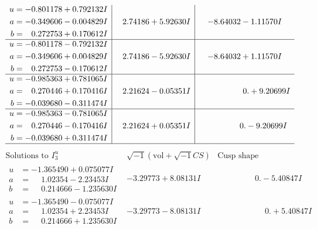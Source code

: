 \documentclass[1p]{elsarticle_modified}
\theoremstyle{definition}
\newcommand{\I}{\sqrt{-1}}
\begin{document}
$$\begin{array}{c|c|c}
\begin{aligned}
u &= -0.801178 + 0.792132 I \\
a &= -0.349606 - 0.004829 I \\
b &= \phantom{-}0.272753 + 0.170612 I\end{aligned}
 & \phantom{-}2.74186 + 5.92630 I & -8.64032 - 1.11570 I \\ \hline\begin{aligned}
u &= -0.801178 - 0.792132 I \\
a &= -0.349606 + 0.004829 I \\
b &= \phantom{-}0.272753 - 0.170612 I\end{aligned}
 & \phantom{-}2.74186 - 5.92630 I & -8.64032 + 1.11570 I \\ \hline\begin{aligned}
u &= -0.985363 + 0.781065 I \\
a &= \phantom{-}0.270446 + 0.170416 I \\
b &= -0.039680 - 0.311474 I\end{aligned}
 & \phantom{-}2.21624 - 0.05351 I & \phantom{-0.000000 -}0. + 9.20699 I \\ \hline\begin{aligned}
u &= -0.985363 - 0.781065 I \\
a &= \phantom{-}0.270446 - 0.170416 I \\
b &= -0.039680 + 0.311474 I\end{aligned}
 & \phantom{-}2.21624 + 0.05351 I & \phantom{-0.000000 } 0. - 9.20699 I\\
 \hline 
 \end{array}$$\newpage$$\begin{array}{c|c|c}  
\text{Solutions to }I^u_{3}& \I (\text{vol} + \sqrt{-1}CS) & \text{Cusp shape}\\
 \hline 
\begin{aligned}
u &= -1.365490 + 0.075077 I \\
a &= \phantom{-}1.02354 - 2.23453 I \\
b &= \phantom{-}0.214666 - 1.235630 I\end{aligned}
 & -3.29773 + 8.08131 I & \phantom{-0.000000 } 0. - 5.40847 I \\ \hline\begin{aligned}
u &= -1.365490 - 0.075077 I \\
a &= \phantom{-}1.02354 + 2.23453 I \\
b &= \phantom{-}0.214666 + 1.235630 I\end{aligned}
 & -3.29773 - 8.08131 I & \phantom{-0.000000 -}0. + 5.40847 I \\ \hline\begin{aligned}

\end{aligned}
\end{array}$$
\end{document}
